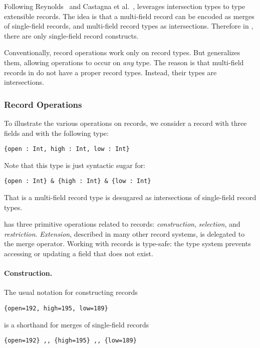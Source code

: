 Following Reynolds~\cite{reynolds1997design} and Castagna et
al.~\cite{castagna1995calculus}, \name leverages intersection types to type
extensible records. The idea is that a multi-field record can be encoded as
merges of single-field records, and multi-field record types as intersections.
Therefore in \name, there are only single-field record constructs. 

Conventionally, record operations work only on record types. But \name
generalizes them, allowing operations to occur on \emph{any} type. The
reason is that multi-field records in \name do not have a proper
record types. Instead, their types are intersections.

\subsubsection{Record Operations}

To illustrate the various operations on records, we consider a record
with three fields and with the following type:

\begin{lstlisting}
{open : Int, high : Int, low : Int} 
\end{lstlisting}

\noindent Note that this type is just syntactic sugar for:

\begin{lstlisting}
{open : Int} & {high : Int} & {low : Int} 
\end{lstlisting}

\noindent That is a multi-field record type is desugared as
intersections of single-field record types.

\name has three primitive operations related to records: \emph{construction},
\emph{selection}, and \emph{restriction}. \emph{Extension}, described in many
other record systems, is delegated to the merge operator. Working with records
is type-safe: the type system prevents accessing or updating a field that does
not exist.

\paragraph{Construction.} The usual notation for constructing records
\begin{lstlisting}
{open=192, high=195, low=189} 
\end{lstlisting}
is a shorthand for merges of single-field records
\begin{lstlisting}
{open=192} ,, {high=195} ,, {low=189} 
\end{lstlisting}

